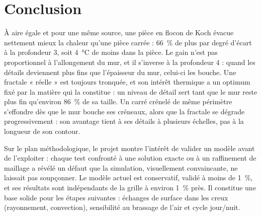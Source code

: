 \documentclass[11pt,a4paper]{article}
\theoremstyle{definition}
\theoremstyle{remark}
\begin{document}
\section{Conclusion}

À aire égale et pour une même source, une pièce en flocon de Koch évacue nettement
mieux la chaleur qu'une pièce carrée : \qty{66}{\percent} de plus par degré d'écart à
la profondeur 3, soit \qty{4}{\degreeCelsius} de moins dans la pièce. Le gain n'est
pas proportionnel à l'allongement du mur, et il s'inverse à la profondeur 4 : quand les
détails deviennent plus fins que l'épaisseur du mur, celui-ci les bouche. Une fractale
« réelle » est toujours tronquée, et son intérêt thermique a un optimum fixé par la
matière qui la constitue : un niveau de détail sert tant que le mur reste plus fin
qu'environ \qty{86}{\percent} de sa taille. Un carré crénelé de même périmètre
s'effondre dès que le mur bouche ses créneaux, alors que la fractale se dégrade
progressivement : son avantage tient à ses détails à plusieurs échelles, pas à la
longueur de son contour.

Sur le plan méthodologique, le projet montre l'intérêt de valider un modèle avant de
l'exploiter : chaque test confronté à une solution exacte ou à un raffinement de
maillage a révélé un défaut que la simulation, visuellement convaincante, ne laissait
pas soupçonner. Le modèle actuel est conservatif, validé à moins de \qty{1}{\percent},
et ses résultats sont indépendants de la grille à environ \qty{1}{\percent} près. Il
constitue une base solide pour les étapes suivantes : échanges de surface dans les
creux (rayonnement, convection), sensibilité au brassage de l'air et cycle jour/nuit.
\end{document}
